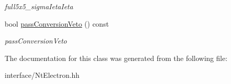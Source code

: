 \begin{DoxyCompactItemize}
\begin{DoxyCompactList}\small\item\em full5x5\-\_\-sigma\-Ieta\-Ieta \end{DoxyCompactList}\item 
\hypertarget{classran_1_1NtElectron_aed16a4122778a43e1d6e9607130e6e7e}{bool \hyperlink{classran_1_1NtElectron_aed16a4122778a43e1d6e9607130e6e7e}{pass\-Conversion\-Veto} () const }\label{classran_1_1NtElectron_aed16a4122778a43e1d6e9607130e6e7e}

\begin{DoxyCompactList}\small\item\em pass\-Conversion\-Veto \end{DoxyCompactList}\end{DoxyCompactItemize}


The documentation for this class was generated from the following file\-:\begin{DoxyCompactItemize}
\item 
interface/Nt\-Electron.\-hh\end{DoxyCompactItemize}
